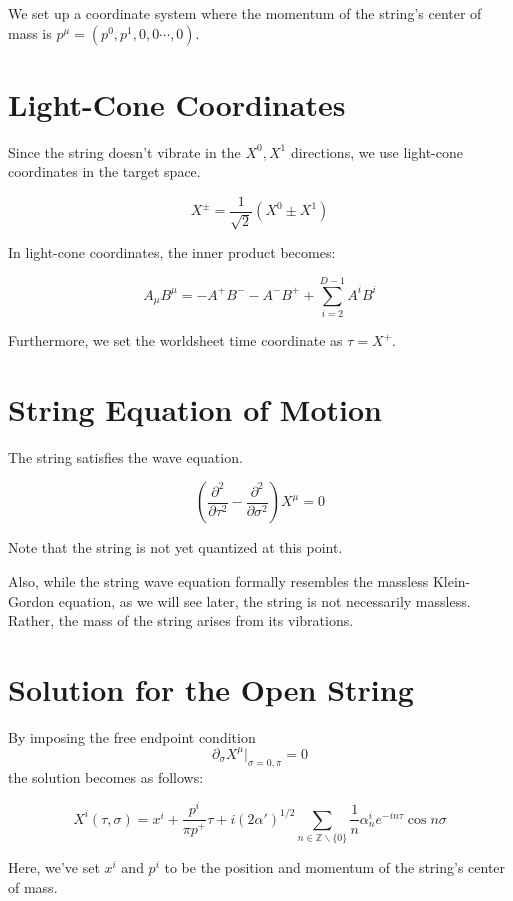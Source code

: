 \documentclass[uplatex]{jsarticle}
\begin{document}
We set up a coordinate system where the momentum of the string's center of mass is
$p^{\mu} = (p^{0} , p^{1}, 0 , 0 \cdots, 0)$.

\section{Light-Cone Coordinates}

Since the string doesn't vibrate in the
$X^{0}, X^{1}$
directions, we use light-cone coordinates in the target space.

$$
	X^{\pm} = \frac{1}{\sqrt{2}} (X^{0} \pm X^{1})
$$

In light-cone coordinates, the inner product becomes:

$$
	A_{\mu} B^{\mu}
	= - A^{+} B^{-} - A^{-} B^{+} + \sum_{i=2}^{D-1} A^{i} B^{i}
$$

Furthermore, we set the worldsheet time coordinate as
$\tau=X^{+}$.

\section{String Equation of Motion}

The string satisfies the wave equation.

$$
	\left(
	\frac{\partial^{2}}{\partial \tau^{2}}
	-
	\frac{\partial^{2}}{\partial \sigma^{2}}
	\right)
	X^{\mu}
	=0
$$


Note that the string is not yet quantized at this point.

Also, while the string wave equation formally resembles the massless Klein-Gordon equation,
as we will see later, the string is not necessarily massless.
Rather, the mass of the string arises from its vibrations.

\section{Solution for the Open String}

By imposing the free endpoint condition
$$
	\partial_{\sigma} X^{\mu} |_{\sigma=0,\pi} = 0
$$
the solution becomes as follows:

$$
	X^{i}(\tau, \sigma)
	=
	x^{i} + \frac{p^{i}}{\pi p^{+}} \tau
	+
	i (2 \alpha')^{1/2} \sum_{n \in \mathbb{Z} \backslash \{ 0 \} }
	\frac{1}{n}
	\alpha^{i}_{n} e^{- i n \tau}
	\cos n \sigma
$$

Here, we've set $x^{i}$ and $p^{i}$ to be the position and momentum of the string's center of mass.
\end{document}
